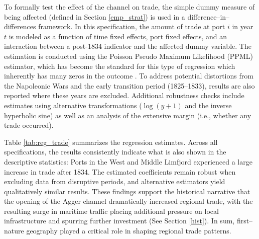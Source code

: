\documentclass[12pt]{article}
\begin{document}
To formally test the effect of the channel on trade, the simple dummy measure of being affected (defined in Section \ref{emp_strat}) is used in a difference–in–differences framework. In this specification, the amount of trade at port $i$ in year $t$ is modeled as a function of time fixed effects, port fixed effects, and an interaction between a post-1834 indicator and the affected dummy variable. The estimation is conducted using the Poisson Pseudo Maximum Likelihood (PPML) estimator, which has become the standard for this type of regression which inherently has many zeros in the outcome \citep{Silva2006, Marczinek2022, SantosSilva2022}. To address potential distortions from the Napoleonic Wars and the early transition period (1825–1833), results are also reported where these years are excluded. Additional robustness checks include estimates using alternative transformations ($\log(y+1)$ and the inverse hyperbolic sine) as well as an analysis of the extensive margin (i.e., whether any trade occurred).
\FloatBarrier

\begin{table}
\centering
\caption{Channel Introduction and Trade} \label{tab:reg_trade}
\footnotesize

\parbox{0.95\textwidth}{
\caption*{\footnotesize \textit{Notes:} Cluster-robust standard errors (clustered at the port level) are reported in parentheses. Column (1) shows Poisson estimates; Column (2) excludes years 1807–1814 and 1825–1833; Columns (3) and (4) use OLS with $\log(y+1)$ and arcsinh transformations to address zero outcomes; Column (5) analyzes the extensive margin (whether any trade occurred). \\ \textit{Source: Sound Toll Registers Online}}
}
\end{table}

Table \ref{tab:reg_trade} summarizes the regression estimates. Across all specifications, the results consistently indicate what is also shown in the descriptive statistics: Ports in the West and Middle Limfjord experienced a large increase in trade after 1834. The estimated coefficients remain robust when excluding data from disruptive periods, and alternative estimators yield qualitatively similar results. These findings support the historical narrative that the opening of the Agger channel dramatically increased regional trade, with the resulting surge in maritime traffic placing additional pressure on local infrastructure and spurring further investment (See Section \ref{hist}). In sum, first–nature geography played a critical role in shaping regional trade patterns.
\end{document}
